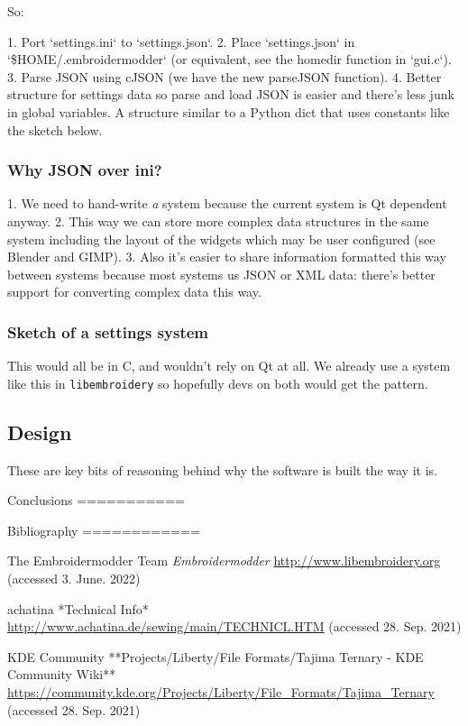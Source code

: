 \documentclass[a4paper]{report}
\begin{document}
So:

1. Port `settings.ini` to `settings.json`.
2. Place `settings.json` in `\$HOME/.embroidermodder` (or equivalent, see the homedir function in `gui.c`).
3. Parse JSON using cJSON (we have the new parseJSON function).
4. Better structure for settings data so parse and load JSON is easier and
   there's less junk in global variables. A structure similar to a Python dict
   that uses constants like the sketch below.

\subsubsection{Why JSON over ini?}

1. We need to hand-write \emph{a} system because the current system is Qt dependent anyway.
2. This way we can store more complex data structures in the same system including the layout of the widgets which may be user configured (see Blender and GIMP).
3. Also it's easier to share information formatted this way between systems because most systems us JSON or XML data: there's better support for converting complex data this way.

\subsubsection{Sketch of a settings system}


This would all be in C, and wouldn't rely on Qt at all. We already use a
system like this in \texttt{libembroidery} so hopefully devs on both
would get the pattern.

\subsection{Design}

These are key bits of reasoning behind why the software is built the way
it is.

Conclusions
===========


Bibliography
============

The Embroidermodder Team \emph{Embroidermodder}
\url{http://www.libembroidery.org} (accessed 3. June. 2022)

achatina *Technical Info*
\url{http://www.achatina.de/sewing/main/TECHNICL.HTM} (accessed 28. Sep. 2021)

KDE Community
**Projects/Liberty/File Formats/Tajima Ternary - KDE Community Wiki**
\url{https://community.kde.org/Projects/Liberty/File_Formats/Tajima_Ternary}
(accessed 28. Sep. 2021)
\end{document}
